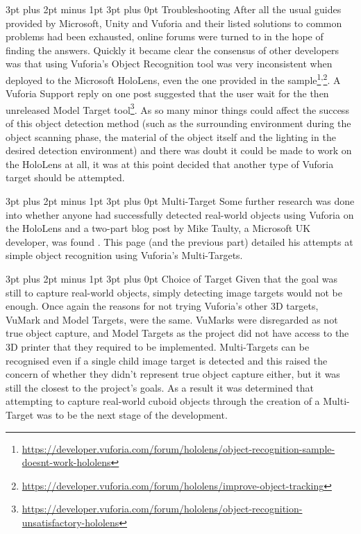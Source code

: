 \documentclass[12pt,a4paper,oneside]{article}
\makeatletter
\renewcommand\paragraph{\@startsection {paragraph}{1}{0mm} %
	                           {3pt plus 2pt minus 1pt} %
	                           {3pt plus 0pt} %
	                           {\normalfont}}
\renewcommand\subsubsection{\@startsection {subsubsection}{1}{0mm} %
	                           {3pt plus 2pt minus 1pt} %
	                           {3pt plus 0pt} %
	                           {\normalfont\bfseries}}
\makeatother
\begin{document}
\paragraph{Troubleshooting}
After all the usual guides provided by Microsoft, Unity and Vuforia and their listed solutions to common problems had been exhausted, online forums were turned to in the hope of finding the answers. Quickly it became clear the consensus of other developers was that using Vuforia's Object Recognition tool was very inconsistent when deployed to the Microsoft HoloLens, even the one provided in the sample\footnote{\url{https://developer.vuforia.com/forum/hololens/object-recognition-sample-doesnt-work-hololens}}\textsuperscript{,}\footnote{\url{https://developer.vuforia.com/forum/hololens/improve-object-tracking}}. A Vuforia Support reply on one post suggested that the user wait for the then unreleased Model Target tool\footnote{\url{https://developer.vuforia.com/forum/hololens/object-recognition-unsatisfactory-hololens}}. As so many minor things could affect the success of this object detection method (such as the surrounding environment during the object scanning phase, the material of the object itself and the lighting in the desired detection environment) and there was doubt it could be made to work on the HoloLens at all, it was at this point decided that another type of Vuforia target should be attempted.

\subsubsection{Multi-Target}
Some further research was done into whether anyone had successfully detected real-world objects using Vuforia on the HoloLens and a two-part blog post by Mike Taulty, a Microsoft UK developer, was found \cite{taulty16}. This page (and the previous part) detailed his attempts at simple object recognition using Vuforia's Multi-Targets.

\paragraph{Choice of Target}
Given that the goal was still to capture real-world objects, simply detecting image targets would not be enough. Once again the reasons for not trying Vuforia's other 3D targets, VuMark and Model Targets, were the same. VuMarks were disregarded as not true object capture, and Model Targets as the project did not have access to the 3D printer that they required to be implemented. Multi-Targets can be recognised even if a single child image target is detected and this raised the concern of whether they didn't represent true object capture either, but it was still the closest to the project's goals. As a result it was determined that attempting to capture real-world cuboid objects through the creation of a Multi-Target was to be the next stage of the development. 
\end{document}
